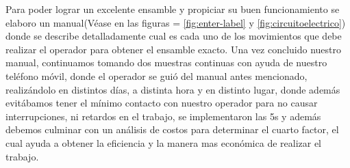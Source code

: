     Para poder lograr un excelente ensamble y propiciar su buen funcionamiento se elaboro un manual(Véase en las figuras = \ref{fig:enter-label} y \ref{fig:circuitoelectrico}) donde se describe detalladamente cual es cada uno de los movimientos que debe realizar el operador para obtener el ensamble exacto. Una vez concluido nuestro manual, continuamos tomando dos muestras continuas con ayuda de nuestro teléfono móvil, donde el operador se guió del manual antes mencionado, realizándolo en distintos días, a distinta hora y en distinto lugar, donde además evitábamos tener el mínimo contacto con nuestro operador para no causar interrupciones, ni retardos en el trabajo, se implementaron las 5s y además debemos culminar con un análisis de costos para determinar el cuarto factor, el cual ayuda a obtener la eficiencia y la manera mas económica de realizar el trabajo.

